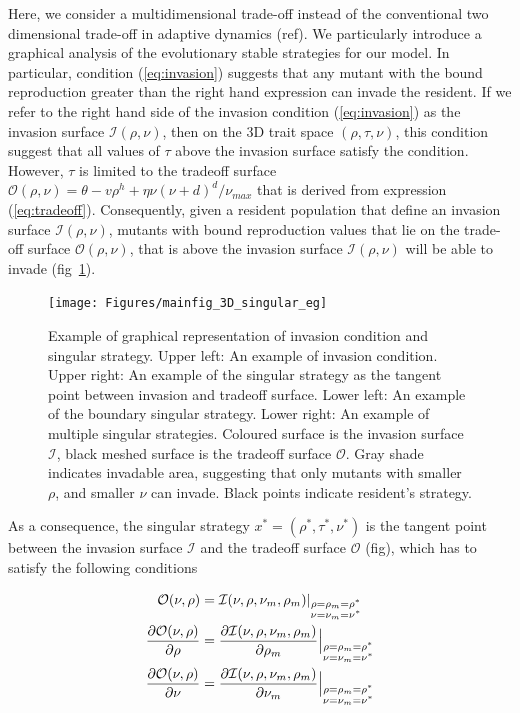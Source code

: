 \documentclass[11pt]{article}
\begin{document}
Here, we consider a multidimensional trade-off instead of the conventional two dimensional trade-off in adaptive dynamics (ref). We particularly introduce a graphical analysis of the evolutionary stable strategies for our model. In particular, condition (\ref{eq:invasion}) suggests that any mutant with the bound reproduction greater than the right hand expression can invade the resident. If we refer to the right hand side of the invasion condition (\ref{eq:invasion}) as the invasion surface $\mathcal{I}(\rho, \nu)$, then on the 3D trait space $(\rho, \tau, \nu)$, this condition suggest that all values of $\tau$ above the invasion surface satisfy the condition. However, $\tau$ is limited to the tradeoff surface $\mathcal{O}(\rho, \nu) = \theta - v \rho^h + \eta \nu (\nu + d )^d/\nu_{max}$ that is derived from expression (\ref{eq:tradeoff}). Consequently, given a resident population that define an invasion surface $\mathcal{I}(\rho, \nu)$, mutants with bound reproduction values that lie on the trade-off surface $\mathcal{O}(\rho, \nu)$, that is above the invasion surface $\mathcal{I}(\rho, \nu)$ will be able to invade (fig~\ref{Fig:invasion_eg}).

\begin{figure}[ht!]
	\centering
	\texttt{[image: Figures/mainfig\_3D\_singular\_eg]}
	\caption{Example of graphical representation of invasion condition and singular strategy. Upper left: An example of invasion condition. Upper right: An example of the singular strategy as the tangent point between invasion and tradeoff surface. Lower left: An example of the boundary singular strategy. Lower right: An example of multiple singular strategies. Coloured surface is the invasion surface $\mathcal{I}$, black meshed surface is the tradeoff surface $\mathcal{O}$. Gray shade indicates invadable area, suggesting that only mutants with smaller $\rho$, and smaller $\nu$ can invade. Black points indicate resident's strategy.}
	\label{Fig:invasion_eg}
\end{figure}

As a consequence, the singular strategy $x^* = (\rho^*, \tau^*, \nu^*)$ is the tangent point between the invasion surface $\mathcal{I}$ and the tradeoff surface $\mathcal{O}$ (fig), which has to satisfy the following conditions

\begin{align}
		\label{eq:singular_cond}
	\mathcal{O}(\nu, \rho) &  = 
	\mathcal{I}(\nu, \rho, \nu_m, \rho_m) |_{\substack{\rho = \rho_m = \rho^*   \\
			\nu = \nu_m = \nu^*}} \notag
	\\
	\frac{\partial \mathcal{O}(\nu, \rho)}{\partial \rho} & = 
	\frac{\partial  \mathcal{I}(\nu, \rho, \nu_m, \rho_m) }{\partial \rho_m}
	\Big|_{\substack{\rho = \rho_m = \rho^* \\
			\nu = \nu_m = \nu^*}} 
	\\
	\frac{\partial \mathcal{O}(\nu, \rho) }{\partial \nu} & = 
	\frac{\partial  \mathcal{I}(\nu, \rho, \nu_m, \rho_m) }{\partial \nu_m} 
	\Big|_{\substack{\rho = \rho_m = \rho^* \\
			\nu = \nu_m = \nu^*}} \notag
\end{align}
\end{document}
